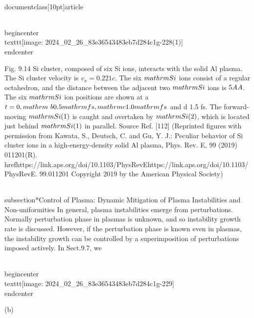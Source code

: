 \\documentclass[10pt]{article}
\begin{document}
{{{{{{\\begin{center}
\\texttt{[image: 2024\_02\_26\_83e36543483eb7d284c1g-228(1)]}
\\end{center}

Fig. 9.14 Si cluster, composed of six Si ions, interacts with the solid Al plasma. The Si cluster velocity is $v_{x}=0.221 c$. The six $\\mathrm{Si}$ ions consist of a regular octahedron, and the distance between the adjacent two $\\mathrm{Si}$ ions is $5 \\AA$. The six $\\mathrm{Si}$ ion positions are shown at a $t=0, \\mathrm{~b} 0.5 \\mathrm{fs}, \\mathrm{c} 1.0 \\mathrm{fs}$ and d 1.5 fs. The forward-moving $\\mathrm{Si}(1)$ is caught and overtaken by $\\mathrm{Si}(2)$, which is located just behind $\\mathrm{Si}(1)$ in parallel. Source Ref. [112] (Reprinted figures with permission from Kawata, S., Deutsch, C. and Gu, Y. J.: Peculiar behavior of Si cluster ions in a high-energy-density solid Al plasma, Phys. Rev. E, 99 (2019) 011201(R). \\href{https://link.aps.org/doi/10.1103/PhysRevE}{https://link.aps.org/doi/10.1103/PhysRevE}. 99.011201 Copyright 2019 by the American Physical Society)

\\subsection*{Control of Plasma: Dynamic Mitigation of Plasma Instabilities and Non-uniformities}
In general, plasma instabilities emerge from perturbations. Normally perturbation phase in plasmas is unknown, and so instability growth rate is discussed. However, if the perturbation phase is known even in plasmas, the instability growth can be controlled by a superimposition of perturbations imposed actively. In Sect.9.7, we

\\begin{center}
\\texttt{[image: 2024\_02\_26\_83e36543483eb7d284c1g-229]}
\\end{center}

(b)

}}}}}}
\end{document}
